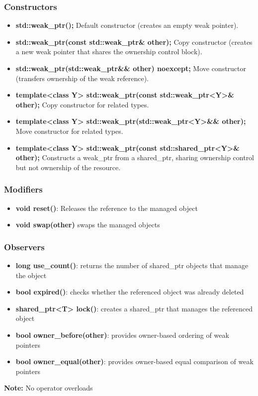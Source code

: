 \documentclass{report}
\begin{document}
        \subsubsection{Constructors}
        \begin{itemize}
            \item \textbf{std::weak\_ptr();}	Default constructor (creates an empty weak pointer).
            \item \textbf{std::weak\_ptr(const std::weak\_ptr\& other);}	Copy constructor (creates a new weak pointer that shares the ownership control block).
            \item \textbf{std::weak\_ptr(std::weak\_ptr\&\& other) noexcept;}	Move constructor (transfers ownership of the weak reference).
            \item \textbf{template<class Y> std::weak\_ptr(const std::weak\_ptr<Y>\& other);}	Copy constructor for related types.
            \item \textbf{template<class Y> std::weak\_ptr(std::weak\_ptr<Y>\&\& other);}	Move constructor for related types.
            \item \textbf{template<class Y> std::weak\_ptr(const std::shared\_ptr<Y>\& other);}	Constructs a weak\_ptr from a shared\_ptr, sharing ownership control but not ownership of the resource.
        \end{itemize}

        \bigbreak \noindent 
        \subsubsection{Modifiers}
        \begin{itemize}
            \item \textbf{void reset()}: Releases the reference to the managed object 
            \item \textbf{void swap(other)} swaps the managed objects
        \end{itemize}

        \bigbreak \noindent 
        \subsubsection{Observers}
        \begin{itemize}
            \item \textbf{long use\_count()}: returns the number of shared\_ptr objects that manage the object
            \item \textbf{bool expired()}: checks whether the referenced object was already deleted
            \item \textbf{shared\_ptr<T> lock()}: creates a shared\_ptr that manages the referenced object
            \item \textbf{bool owner\_before(other)}: provides owner-based ordering of weak pointers
            \item \textbf{bool owner\_equal(other)}: provides owner-based equal comparison of weak pointers
        \end{itemize}
        \bigbreak \noindent 
        \textbf{Note:} No operator overloads
        \bigbreak \noindent 
\end{document}
